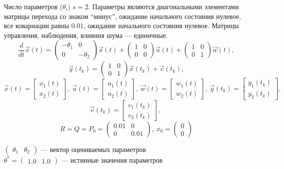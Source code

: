 \documentclass[a4paper,14pt]{extarticle}
\begin{document}
Число параметров ($\theta_i$) $s = 2$. Параметры являются диагональными
элементами матрицы перехода со знаком ``минус'', ожидание начального состояния
нулевое, все ковариации равны $0.01$, ожидание начального состояния нулевое.
Матрицы управления, наблюдения, влияния шума --- единичные.
\[
	\frac{d}{dt}\vec{x}(t) =
		\begin{pmatrix}
			-\theta_1 & 0 \\
			0 & -\theta_2
		\end{pmatrix}
		\vec{x}(t) +
		\begin{pmatrix}
			1 & 0 \\
			0 & 0
		\end{pmatrix}
		\vec{u}(t) +
		\begin{pmatrix}
			1 & 0 \\
			0 & 1
		\end{pmatrix}
		\vec{w}(t),
\]
\[
	\vec{y}(t_k) =
	\begin{pmatrix}
		1 & 0 \\
		0 & 1
	\end{pmatrix}
	\vec{x}(t_k) + \vec{v}(t_k),
\]
\[
	\vec{x}(t) = \begin{bmatrix} x_1(t) \\ x_2(t) \end{bmatrix},\ 
	\vec{u}(t) = \begin{bmatrix} u_1(t) \\ u_2(t) \end{bmatrix},\
	\vec{w}(t) = \begin{bmatrix} w_1(t) \\ w_2(t) \end{bmatrix},\
	\vec{y}(t_k) = \begin{bmatrix} y_1(t_k) \\ y_2(t_k) \end{bmatrix},\
\]
\[
	\vec{v}(t_k) = \begin{bmatrix} v_1(t_k) \\ v_2(t_k) \end{bmatrix},\
\]
\[
	R = Q = P_0 = \begin{pmatrix} 0.01 & 0 \\ 0 & 0.01 \end{pmatrix},\
	\overline{x_0} = \begin{pmatrix} 0 \\ 0 \end{pmatrix}
\]

$\begin{pmatrix} \theta_1 & \theta_2 \end{pmatrix}$ --- вектор оцениваемых
	параметров \\ \indent $\theta^{*} = \begin{pmatrix} 1.0 & 1.0 \end{pmatrix}$
		--- истинные значения параметров
\end{document}
